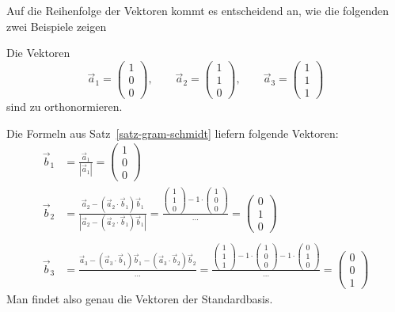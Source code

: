 Auf die Reihenfolge der Vektoren kommt es entscheidend an, wie die
folgenden zwei Beispiele zeigen
\begin{beispiel}
Die Vektoren
\[
\vec a_1=\begin{pmatrix}1\\0\\0\end{pmatrix},\qquad
\vec a_2=\begin{pmatrix}1\\1\\0\end{pmatrix},\qquad
\vec a_3=\begin{pmatrix}1\\1\\1\end{pmatrix}
\]
sind zu orthonormieren.

Die Formeln aus Satz~\ref{satz-gram-schmidt} liefern folgende Vektoren:
\begin{align*}
\vec b_1&=\frac{\vec a_1}{|\vec a_1|}=\begin{pmatrix}1\\0\\0\end{pmatrix}\\
\vec b_2&=
\frac{
\vec a_2-(\vec a_2\cdot \vec b_1)\vec b_1
}{
|\vec a_2-(\vec a_2\cdot \vec b_1)\vec b_1|
}
=
\frac{
\begin{pmatrix}1\\1\\0\end{pmatrix}-1\cdot\begin{pmatrix}1\\0\\0\end{pmatrix}
}{\dots}=\begin{pmatrix}0\\1\\0\end{pmatrix}\\
\\
\vec b_3&=
\frac{\vec a_3 -(\vec a_3\cdot \vec b_1)\vec b_1-(\vec a_3\cdot\vec b_2)\vec b_2}{\dots}
=\frac{\begin{pmatrix}1\\1\\1\end{pmatrix}-1\cdot \begin{pmatrix}1\\0\\0\end{pmatrix}-1\cdot\begin{pmatrix}0\\1\\0\end{pmatrix}
}{\dots}=\begin{pmatrix}0\\0\\1\end{pmatrix}
\end{align*}
Man findet also genau die Vektoren der Standardbasis.
\end{beispiel}

